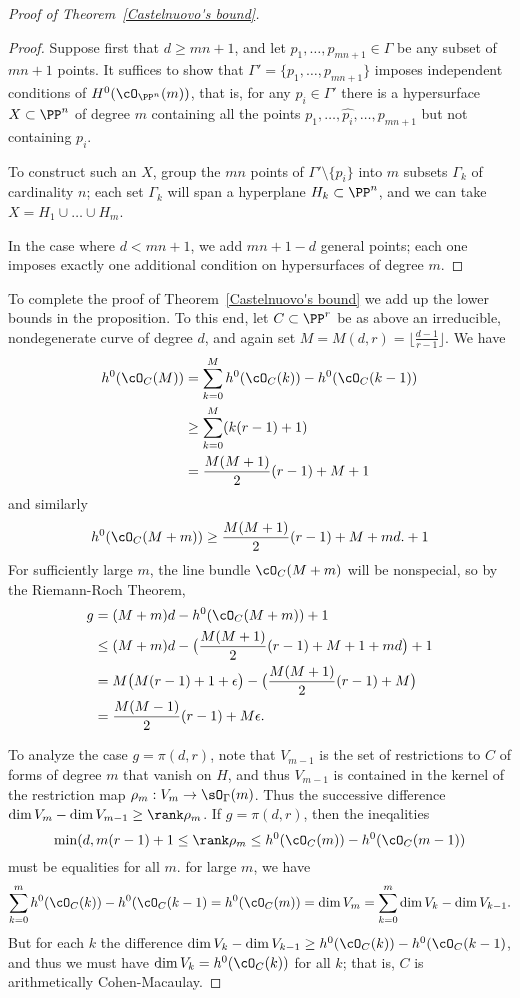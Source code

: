 \begin{proof}[Proof of Theorem~\ref{Castelnuovo's bound}]
\begin{proof}
Suppose first that $d \geq mn+1$, and let $p_1,\dots,p_{mn+1} \in \Gamma$ be any subset of $mn+1$ points. It suffices to show that $\Gamma' = \{p_1,\dots,p_{mn+1}\}$ imposes independent conditions of $H^0(\cO_{\PP^n}(m))$, that is, for any $p_i \in \Gamma'$ there is a hypersurface $X \subset \PP^n$ of degree $m$ containing all the points $p_1,\dots, \hat{p_i},\dots,p_{mn+1}$ but not containing $p_i$.

To construct such an $X$, group the $mn$ points of $\Gamma' \setminus \{p_i\}$ into $m$ subsets $\Gamma_k$ of cardinality $n$; each set $\Gamma_k$ will span a hyperplane $H_k \subset \PP^n$, and we can take $X = H_1 \cup \dots \cup H_m$. 

In the case where $d<mn+1$, we add $mn+1-d$ general points; each one imposes exactly one
additional condition on hypersurfaces of degree $m$.
\end{proof}


To complete the proof of Theorem~\ref{Castelnuovo's bound} we add up the lower bounds in the proposition. To this end, let $C \subset \PP^r$ be as above an irreducible, nondegenerate curve of degree $d$, and again set 
$M = M(d,r) = \lfloor{\frac{d-1}{r-1}}\rfloor$.
We have 
\begin{align*}
h^0(\cO_C(M)) &= \sum_{k=0}^M h^0(\cO_C(k)) - h^0(\cO_C(k-1)) \\
&\geq  \sum_{k=0}^M (k(r-1)+1) \\
&= \frac{M(M+1)}{2}(r-1) + M + 1
\end{align*}
and similarly
$$
h^0(\cO_C(M+m)) \geq \frac{M(M+1)}{2}(r-1) + M  + md.+ 1
$$
For sufficiently large $m$, the line bundle $\cO_C(M+m)$ will be nonspecial, so by the Riemann-Roch Theorem,
\begin{align*}
g &= (M+m)d - h^0(\cO_C(M+m)) + 1 \\
&\leq (M+m)d - \bigl(  \frac{M(M+1)}{2}(r-1) + M + 1 + md \bigr)+1 \\
& = M\bigl( M(r-1) + 1 + \epsilon \bigr) - \bigl(  \frac{M(M+1)}{2}(r-1) + M  \bigr) \\
&= \frac{M(M-1)}{2}(r-1) + M\epsilon.
\end{align*}

To analyze the case $g=\pi(d,r)$, note that
 $V_{m-1}$ is the set of restrictions to $C$ of forms of degree $m$ that vanish on $H$, and
thus $V_{m-1}$ is contained in the kernel of the restriction map $\rho_m: V_m \to \sO_\Gamma(m)$. Thus the successive
difference $\dim V_m - \dim V_{m-1}\geq \rank \rho_m$. If $g=\pi(d,r)$, then the ineqalities
$$
\min(d, m(r-1)+1 \leq \rank \rho_m \leq h^0(\cO_C(m)) - h^0(\cO_C(m-1))
$$
must be equalities for all $m$.  for large $m$, we have
$$
\sum_{k=0}^m h^0(\cO_C(k)) - h^0(\cO_C(k-1) = h^0(\cO_C(m)) = \dim V_m = \sum_{k=0}^m \dim V_k - \dim V_{k-1}.
$$
But for each $k$ the difference $\dim V_k - \dim V_{k-1}\geq h^0(\cO_C(k)) - h^0(\cO_C(k-1)$,
and thus we must have $\dim V_k=h^0(\cO_C(k))$ for all $k$; that is, $C$ is arithmetically Cohen-Macaulay.
 \end{proof}


